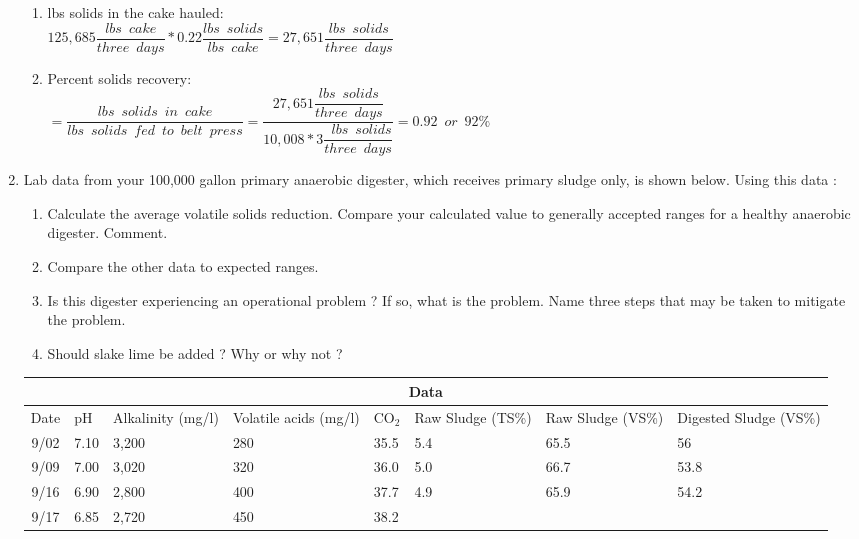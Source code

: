 \begin{enumerate}
\begin{enumerate}
\item lbs solids in the cake hauled:\\
$
	{125,685 
	\dfrac{lbs \enspace cake}{three \enspace days}}
	*
	{0.22
	\dfrac{lbs \enspace solids}{lbs \enspace cake}}
	=\boxed
	{27,651
	\dfrac{lbs \enspace solids}{three \enspace days}}
$

\item Percent solids recovery:\\
$=
	\dfrac
	{lbs \enspace solids \enspace in \enspace cake}
	{lbs \enspace solids \enspace fed \enspace to \enspace belt \enspace press}
= 	\dfrac
	{27,651 
		\dfrac
		{lbs \enspace solids}{three \enspace days}}
		{10,008*3
			\dfrac
			{\enspace lbs \enspace solids}
			{three \enspace days}}
=\boxed{0.92 \enspace or \enspace 92\%}
$
\end{enumerate}

\item Lab data from your 100,000 gallon primary anaerobic digester, which receives primary sludge only, is shown below. Using this data :
\begin{enumerate}
\item Calculate the average volatile solids reduction. Compare your calculated value to generally accepted ranges for a healthy anaerobic digester. Comment.
\item Compare the other data to expected ranges.
\item Is this digester experiencing an operational problem ? If so, what is the problem. Name three steps that may be taken to mitigate the problem.
\item Should slake lime be added ? Why or why not ?
\end{enumerate}
\begin{tabular}{ |c|p{1cm}|p{1.5cm}|p{1.5cm}|p{1cm}|p{1.5cm}|p{1.5cm}|p{1.5cm}|}
 \hline
 \multicolumn{8}{|c|}{Data} \\
 \hline
Date& pH&Alkalinity (mg/l)&Volatile acids (mg/l)&CO$_2$&Raw Sludge (TS\%)&Raw Sludge (VS\%)&Digested Sludge (VS\%)\\
 \hline
 9/02   & 7.10    &3,200& 280 &35.5 &5.4 & 65.5 & 56\\
 9/09   & 7.00    &3,020& 320 &36.0  &5.0 & 66.7 & 53.8\\
 9/16   & 6.90    &2,800& 400 &37.7 & 4.9 & 65.9 & 54.2\\
 9/17   & 6.85    &2,720& 450 &38.2 & & &\\
 \hline
\end{tabular}\\
\vspace{0.25cm}


\end{enumerate}
